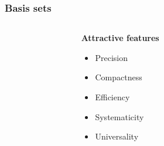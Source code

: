 \begin{frame}
    \frametitle{Basis sets}
    \vspace{1.8mm}
    \begin{columns}
    \begin{column}{.10\textwidth}
    \end{column}
    \begin{column}{.30\textwidth}
    \textbf{Attractive features}
    \begin{itemize}
        \item Precision
        \item Compactness
        \item Efficiency
        \item Systematicity
        \item Universality
    \end{itemize}
    \end{column}
    \begin{column}{.60\textwidth}

    \vspace{5mm}

    \end{column}
    \end{columns}

    \vspace{40.2mm}

\end{frame}

